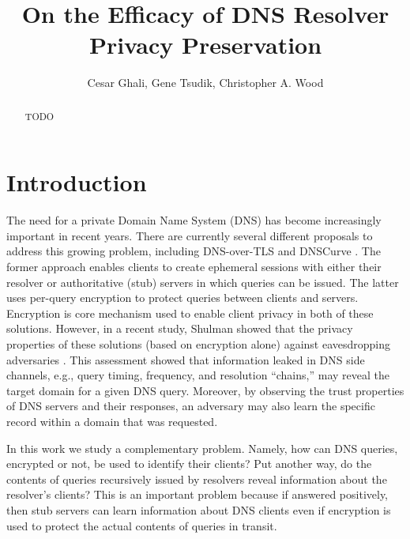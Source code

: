 \documentclass{llncs}
\begin{document}
\mainmatter              %
\title{On the Efficacy of DNS Resolver Privacy Preservation}

\author{Cesar Ghali, Gene Tsudik, Christopher A. Wood}


\maketitle

\begin{abstract}
TODO
\end{abstract}

\section{Introduction}
The need for a private Domain Name System (DNS) has become increasingly important
in recent years. There are currently several different proposals to address this
growing problem, including DNS-over-TLS \cite{dnstls} and DNSCurve \cite{dnscurve}.
The former approach enables clients to create ephemeral sessions with either
their resolver or authoritative (stub) servers in which queries can be issued.
The latter uses per-query encryption to protect queries between clients and servers.
Encryption is core mechanism used to enable client privacy in both of these 
solutions. However, in a recent study, Shulman showed that the privacy properties
of these solutions (based on encryption alone) against eavesdropping 
adversaries \cite{shulman2014pretty}. This assessment showed that information leaked
in DNS side channels, e.g., query timing, frequency, and resolution ``chains,'' 
may reveal the target domain for a given DNS query. Moreover, by observing the
trust properties of DNS servers and their responses, an adversary may also 
learn the specific record within a domain that was requested. 

In this work we study a complementary problem. Namely, how can DNS queries, 
encrypted or not, be used to identify their clients? Put another way, do the 
contents of queries recursively issued by resolvers reveal information about
the resolver's clients? This is an important problem because if answered
positively, then stub servers can learn information about DNS clients even
if encryption is used to protect the actual contents of queries in transit. 
\end{document}
